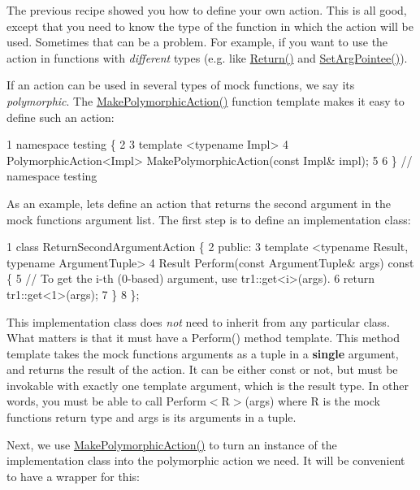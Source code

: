 The previous recipe showed you how to define your own action. This is all good, except that you need to know the type of the function in which the action will be used. Sometimes that can be a problem. For example, if you want to use the action in functions with {\itshape different} types (e.\+g. like {\ttfamily \hyperlink{namespacetesting_af6d1c13e9376c77671e37545cd84359c}{Return()}} and {\ttfamily \hyperlink{namespacetesting_a5740a5033b88c37666fcd09a269d123f}{Set\+Arg\+Pointee()}}).

If an action can be used in several types of mock functions, we say it\textquotesingle{}s {\itshape polymorphic}. The {\ttfamily \hyperlink{namespacetesting_a36bd06c5ea972c6df0bd9f40a7a94c65}{Make\+Polymorphic\+Action()}} function template makes it easy to define such an action\+:


\begin{DoxyCode}
1 namespace testing \{
2 
3 template <typename Impl>
4 PolymorphicAction<Impl> MakePolymorphicAction(const Impl& impl);
5 
6 \}  // namespace testing
\end{DoxyCode}


As an example, let\textquotesingle{}s define an action that returns the second argument in the mock function\textquotesingle{}s argument list. The first step is to define an implementation class\+:


\begin{DoxyCode}
1 class ReturnSecondArgumentAction \{
2  public:
3   template <typename Result, typename ArgumentTuple>
4   Result Perform(const ArgumentTuple& args) const \{
5     // To get the i-th (0-based) argument, use tr1::get<i>(args).
6     return tr1::get<1>(args);
7   \}
8 \};
\end{DoxyCode}


This implementation class does {\itshape not} need to inherit from any particular class. What matters is that it must have a {\ttfamily Perform()} method template. This method template takes the mock function\textquotesingle{}s arguments as a tuple in a {\bfseries single} argument, and returns the result of the action. It can be either {\ttfamily const} or not, but must be invokable with exactly one template argument, which is the result type. In other words, you must be able to call {\ttfamily Perform$<$R$>$(args)} where {\ttfamily R} is the mock function\textquotesingle{}s return type and {\ttfamily args} is its arguments in a tuple.

Next, we use {\ttfamily \hyperlink{namespacetesting_a36bd06c5ea972c6df0bd9f40a7a94c65}{Make\+Polymorphic\+Action()}} to turn an instance of the implementation class into the polymorphic action we need. It will be convenient to have a wrapper for this\+:


